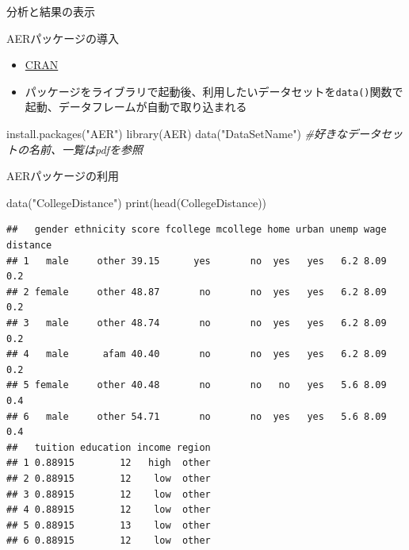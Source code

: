 \documentclass[
  ignorenonframetext,
]{beamer}
\newenvironment{Shaded}{\begin{snugshade}}{\end{snugshade}}
\newcommand{\CommentTok}[1]{\textcolor[rgb]{0.56,0.35,0.01}{\textit{#1}}}
\newcommand{\FunctionTok}[1]{\textcolor[rgb]{0.00,0.00,0.00}{#1}}
\newcommand{\NormalTok}[1]{#1}
\newcommand{\StringTok}[1]{\textcolor[rgb]{0.31,0.60,0.02}{#1}}
\providecommand{\tightlist}{%
  \setlength{\itemsep}{0pt}\setlength{\parskip}{0pt}}
\begin{document}
\begin{frame}[fragile]{分析と結果の表示}
\begin{block}{AERパッケージの導入}
\begin{itemize}
  \begin{itemize}
  \tightlist
  \item
    \href{https://cran.r-project.org/web/packages/AER/AER.pdf}{CRAN}
  \item
    パッケージをライブラリで起動後、利用したいデータセットを\texttt{data()}関数で起動、データフレームが自動で取り込まれる
  \end{itemize}
\end{itemize}

\begin{Shaded}
\begin{Highlighting}[]
\FunctionTok{install.packages}\NormalTok{(}\StringTok{"AER"}\NormalTok{)}
\FunctionTok{library}\NormalTok{(AER)}
\FunctionTok{data}\NormalTok{(}\StringTok{"DataSetName"}\NormalTok{) }\CommentTok{\#好きなデータセットの名前、一覧はpdfを参照}
\end{Highlighting}
\end{Shaded}
\end{block}

\begin{block}{AERパッケージの利用}
\protect\hypertarget{aerux30d1ux30c3ux30b1ux30fcux30b8ux306eux5229ux7528}{}
\begin{Shaded}
\begin{Highlighting}[]
\FunctionTok{data}\NormalTok{(}\StringTok{"CollegeDistance"}\NormalTok{)}
\FunctionTok{print}\NormalTok{(}\FunctionTok{head}\NormalTok{(CollegeDistance))}
\end{Highlighting}
\end{Shaded}

\begin{verbatim}
##   gender ethnicity score fcollege mcollege home urban unemp wage distance
## 1   male     other 39.15      yes       no  yes   yes   6.2 8.09      0.2
## 2 female     other 48.87       no       no  yes   yes   6.2 8.09      0.2
## 3   male     other 48.74       no       no  yes   yes   6.2 8.09      0.2
## 4   male      afam 40.40       no       no  yes   yes   6.2 8.09      0.2
## 5 female     other 40.48       no       no   no   yes   5.6 8.09      0.4
## 6   male     other 54.71       no       no  yes   yes   5.6 8.09      0.4
##   tuition education income region
## 1 0.88915        12   high  other
## 2 0.88915        12    low  other
## 3 0.88915        12    low  other
## 4 0.88915        12    low  other
## 5 0.88915        13    low  other
## 6 0.88915        12    low  other
\end{verbatim}
\end{block}


\end{frame}
\end{document}

